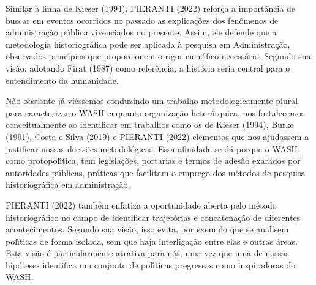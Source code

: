 \documentclass[
12pt,		%
openright,	%
twoside,  %
a4paper,			%
chapter=TITLE,		%
english,			%
french,				%
spanish,			%
brazil				%
]{USPSC-classe/USPSC}
\begin{document}
Similar \`a linha de  Kieser (1994),  PIERANTI (2022) refor\c{c}a a import\^ancia de buscar em eventos ocorridos no passado as explica\c{c}\~oes dos fen\^omenos de administra\c{c}\~ao p\'ublica vivenciados no presente. Assim, ele defende que \textquotedbl a metodologia historiogr\'afica pode ser aplicada \`a pesquisa em Administra\c{c}\~ao\textquotedbl , observados princ\'{\i}pios que proporcionem o rigor cient\'{\i}fico necess\'ario. Segundo sua vis\~ao, adotando  Firat (1987) como refer\^encia, a hist\'oria seria \textquotedbl central para o entendimento da humanidade\textquotedbl .

















N\~ao obstante j\'a vi\'essemos conduzindo um trabalho metodologicamente plural para caracterizar o WASH enquanto organiza\c{c}\~ao heter\'arquica, nos fortalecemos conceitualmente ao identificar em trabalhos como os de  Kieser (1994),  Burke (1991), Costa e Silva (2019) e PIERANTI (2022) elementos que nos ajudassem a justificar nossas decis\~oes metodol\'ogicas. Essa afinidade se d\'a porque o WASH, como protopol\'{\i}tica, tem legisla\c{c}\~oes, portarias e termos de ades\~ao exarados por autoridades p\'ublicas, pr\'aticas que facilitam o emprego dos m\'etodos de pesquisa historiogr\'afica em administra\c{c}\~ao.

















 PIERANTI (2022) tamb\'em enfatiza a oportunidade aberta pelo m\'etodo historiogr\'afico  no campo de identificar trajet\'orias e concatena\c{c}\~ao de diferentes acontecimentos. Segundo sua vis\~ao, \textquotedbl isso evita, por exemplo que se analisem pol\'{\i}ticas de forma isolada, sem que haja interliga\c{c}\~ao entre elas e outras \'areas\textquotedbl . Esta vis\~ao \'e particularmente atrativa para n\'os, uma vez que uma de nossas hip\'oteses identifica um conjunto de pol\'{\i}ticas pregressas como inspiradoras do WASH.
\end{document}
